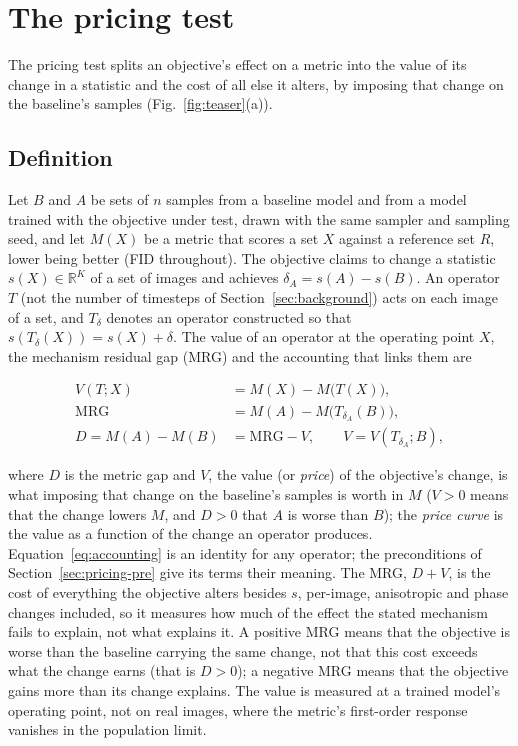 \section{The pricing test}
\label{sec:pricing-test}
\label{sec:pricing-protocol}

The pricing test splits an objective's effect on a metric into the value of
its change in a statistic and the cost of all else it alters, by imposing that
change on the baseline's samples (Fig.~\ref{fig:teaser}(a)).

\subsection{Definition}
\label{sec:pricing-def}

Let $B$ and $A$ be sets of $n$ samples from a baseline model and from a model
trained with the objective under test, drawn with the same sampler and
sampling seed, and let $M(X)$ be a metric that scores a set $X$ against a
reference set $R$, lower being better (FID throughout). The objective claims to
change a statistic $s(X) \in \mathbb{R}^K$ of a set of images and achieves
$\delta_A = s(A) - s(B)$. An operator $T$ (not the number of timesteps of
Section~\ref{sec:background}) acts on each image of a set, and $T_\delta$
denotes an operator constructed so that $s(T_\delta(X)) = s(X) + \delta$. The
value of an operator at the operating point $X$, the mechanism residual gap
(MRG) and the accounting that links them are
\begin{linenomath}
\begin{align}
  V(T; X) &= M(X) - M\big(T(X)\big), \label{eq:value}\\
  \mathrm{MRG} &= M(A) - M\big(T_{\delta_A}(B)\big), \label{eq:mrg}\\
  D = M(A) - M(B) &= \mathrm{MRG} - V, \qquad V = V(T_{\delta_A}; B),
  \label{eq:accounting}
\end{align}
\end{linenomath}
where $D$ is the metric gap and $V$, the value (or \emph{price}) of the
objective's change, is what imposing that change on the baseline's samples is
worth in $M$ ($V > 0$ means that the change lowers $M$, and $D > 0$ that $A$
is worse than $B$); the \emph{price curve} is the value as a function of the change
an operator produces. Equation~\eqref{eq:accounting} is an identity for any
operator; the preconditions of Section~\ref{sec:pricing-pre} give its terms
their meaning. The MRG, $D + V$, is the cost of everything the objective
alters besides $s$, per-image, anisotropic and phase changes included, so it
measures how much of the effect the stated mechanism fails to explain, not
what explains it. A positive MRG means that the objective is worse than the
baseline carrying the same change, not that this cost exceeds what the change
earns (that is $D > 0$); a negative MRG means that the objective gains more
than its change explains. The value is measured at a trained model's
operating point, not on real images, where the metric's first-order response
vanishes in the population limit.

